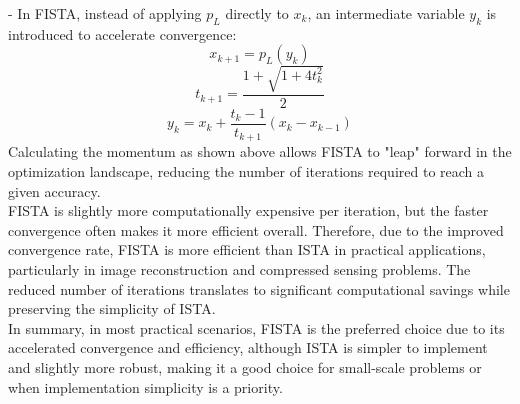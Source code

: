 \documentclass{article}
\begin{document}
\begin{enumerate}
\begin{enumerate}
- In FISTA, instead of applying \( p_L \) directly to \( x_k \), an intermediate variable \( y_k \) is introduced to accelerate convergence:
  \begin{equation}
      x_{k+1} = p_L(y_k)
  \end{equation}
  \begin{equation}
      t_{k+1} = \frac{1 + \sqrt{1 + 4t_k^2}}{2}
  \end{equation}
  \begin{equation}
      y_k = x_k + \frac{t_k - 1}{t_{k+1}} (x_k - x_{k-1})
  \end{equation}
Calculating the momentum as shown above allows FISTA to "leap" forward in the optimization landscape, reducing the number of iterations required to reach a given accuracy. \\
FISTA is slightly more computationally expensive per iteration, but the faster convergence often makes it more efficient overall. Therefore, due to the improved convergence rate, FISTA is more efficient than ISTA in practical applications, particularly in image reconstruction and compressed sensing problems. The reduced number of iterations translates to significant computational savings while preserving the simplicity of ISTA. \\
In summary, in most practical scenarios, FISTA is the preferred choice due to its accelerated convergence and efficiency, although ISTA is simpler to implement and slightly more robust, making it a good choice for small-scale problems or when implementation simplicity is a priority.

\end{enumerate}
\end{enumerate}
\end{document}
